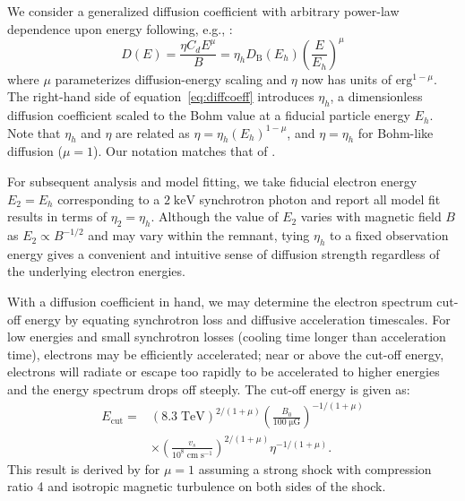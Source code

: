 \documentclass[manuscript]{aastex}  %
\newcommand*{\mt}{\mathrm}
\newcommand*{\unit}[1]{\;\mt{#1}}  %
\newcommand*{\Ecut}{E_{\mt{cut}}}
\newcommand*{\muG}{\unit{\mu G}}
\begin{document}
We consider a generalized diffusion coefficient with arbitrary
power-law dependence upon energy following, e.g., \citet{parizot2006}:
\begin{equation} \label{eq:diffcoeff}
    D(E) = \frac{\eta C_d E^\mu}{B}
         = \eta_h D_{\mt{B}}\left(E_h\right) \left(\frac{E}{E_h}\right)^\mu
\end{equation}
where $\mu$ parameterizes diffusion-energy scaling and $\eta$ now has units
of $\mt{erg}^{1-\mu}$.  The right-hand side of equation~\eqref{eq:diffcoeff}
introduces $\eta_h$, a dimensionless diffusion coefficient scaled to the Bohm
value at a fiducial particle energy $E_h$.  Note that $\eta_h$ and $\eta$ are
related as $\eta = \eta_h (E_h)^{1-\mu}$, and $\eta = \eta_h$ for Bohm-like
diffusion ($\mu = 1$).  Our notation matches that of .

For subsequent analysis and model fitting, we take fiducial electron energy
$E_2 = E_h$ corresponding to a $2 \unit{keV}$ synchrotron photon and report all
model fit results in terms of $\eta_2 = \eta_h$.  Although the value of $E_2$
varies with magnetic field $B$ as $E_2 \propto B^{-1/2}$ and may vary within
the remnant, tying $\eta_h$ to a fixed observation energy gives a convenient
and intuitive sense of diffusion strength regardless of the underlying electron
energies.

With a diffusion coefficient in hand, we may determine the electron spectrum
cut-off energy by equating synchrotron loss and diffusive acceleration
timescales.  For low energies and small synchrotron losses (cooling time longer
than acceleration time), electrons may be efficiently accelerated; near or
above the cut-off energy, electrons will radiate or escape too rapidly to be
accelerated to higher energies and the energy spectrum drops off steeply.  The
cut-off energy is given as:
\begin{align} \label{eq:ecut}
    \Ecut =
        &\left(8.3\unit{TeV}\right)^{2/(1+\mu)}
        \left(\frac{B_0}{100 \muG}\right)^{-1/(1+\mu)} \nonumber \\
        &\times \left(\frac{v_s}{10^8 \unit{cm\;s^{-1}}}\right)^{2/(1+\mu)}
        \eta^{-1 / (1+\mu)} .
\end{align}
This result is derived by \citet{parizot2006} for $\mu=1$ assuming a strong
shock with compression ratio 4 and isotropic magnetic turbulence on both sides
of the shock.
\end{document}
